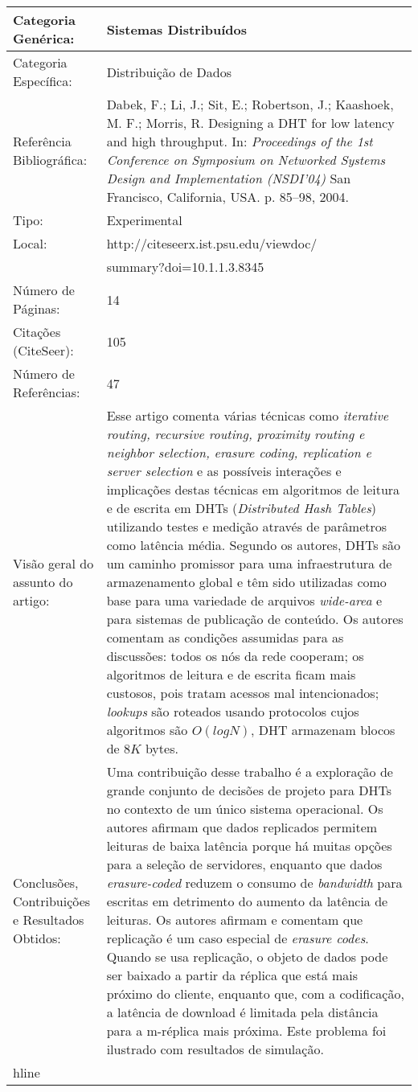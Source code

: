 \documentclass[10pt,a4paper]{article}
\begin{document}
\begin{center}
\begin{tabular}{|p{5cm}||p{10cm}|}
\hline
Categoria Genérica: & Sistemas Distribuídos\\\hline
Categoria Específica: & Distribuição de Dados\\\hline
Referência Bibliográfica: & Dabek, F.; Li, J.; Sit, E.; Robertson, J.; Kaashoek, M. F.; Morris, R. Designing a DHT for low latency and high throughput. In: \emph{Proceedings of the 1st Conference on Symposium on Networked Systems Design and Implementation (NSDI'04)} San Francisco, California, USA. p. 85--98, 2004.\\\hline
Tipo: & Experimental\\\hline
Local: & http://citeseerx.ist.psu.edu/viewdoc/\\ & summary?doi=10.1.1.3.8345\\\hline
Número de Páginas: & 14\\\hline
Citações (CiteSeer): & 105\\\hline
Número de Referências: & 47\\\hline
Visão geral do assunto do artigo: & Esse artigo comenta várias técnicas como \emph{iterative routing, recursive routing, proximity routing e neighbor selection, erasure coding, replication e server selection} e as possíveis interações e implicações destas técnicas em algoritmos de leitura e de escrita em DHTs (\emph{Distributed Hash Tables}) utilizando testes e medição através de parâmetros como latência média. Segundo os autores, DHTs são um caminho promissor para uma infraestrutura de armazenamento global e têm sido utilizadas como base para uma variedade de arquivos \emph{wide-area} e para sistemas de publicação de conteúdo. Os autores comentam as condições assumidas para as discussões: todos os nós da rede cooperam; os algoritmos de leitura e de escrita ficam mais custosos, pois tratam acessos mal intencionados; \emph{lookups} são roteados usando protocolos cujos algoritmos são $O(log N)$, DHT armazenam blocos de $8K$ bytes. \\\hline
Conclusões, Contribuições e Resultados Obtidos: & Uma contribuição desse trabalho é a exploração de grande conjunto de decisões de projeto para DHTs no contexto de um único sistema operacional. Os autores afirmam que dados replicados permitem leituras de baixa latência porque há muitas opções para a seleção de servidores, enquanto que dados \emph{erasure-coded} reduzem o consumo de \emph{bandwidth} para escritas em detrimento do aumento da latência de leituras. Os autores afirmam e comentam que replicação é um caso especial de \emph{erasure codes}. Quando se usa replicação, o objeto de dados pode ser baixado a partir da réplica que está mais próximo do cliente, enquanto que, com a codificação, a latência de download é limitada pela distância para a m-réplica mais próxima. Este problema foi ilustrado com resultados de simulação.\\hline

\end{tabular}
\end{center}
\end{document}
